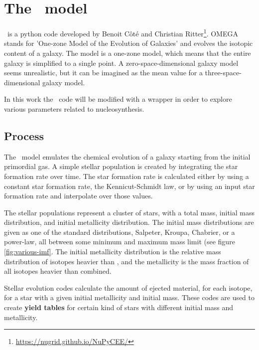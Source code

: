 \section{The \omegamodel\ model}
\label{sec:omega}
\omegamodel\ is a python code developed by Benoit C\^{o}t\'{e} and Christian Ritter\footnote{\url{https://nugrid.github.io/NuPyCEE/}}.
OMEGA stands for 'One-zone Model of the Evolution of Galaxies' and evolves the isotopic content of a galaxy.
The model is a one-zone model, which means that the entire galaxy is simplified to a single point.
A zero-space-dimensional galaxy model seems unrealistic, but it can be imagined as the mean value for a three-space-dimensional galaxy model.

In this work the \omegamodel\ code will be modified with a wrapper in order to explore various parameters related to nucleosynthesis.

\subsection{Process}
\label{sec:omega-process}
The \omegamodel\ model emulates the chemical evolution of a galaxy starting from the initial primordial gas. A simple stellar population is created by integrating the star formation rate over time.
The star formation rate is calculated either by using a constant star formation rate, the Kennicut-Schmidt law, or by using an input star formation rate and interpolate over those values.

The stellar populations represent a cluster of stars, with a total mass, initial mass distribution, and initial metallicity distribution.
The initial mass distributions are given as one of the standard distributions, Salpeter, Kroupa, Chabrier, or a power-law, all between some minimum and maximum mass limit (see figure \ref{fig:various-imf}.
The initial metallicity distribution is the relative mass distribution of isotopes heavier than , and the metallicity is the mass fraction of all isotopes heavier than  combined.

Stellar evolution codes calculate the amount of ejected material, for each isotope, for a star with a given initial metallicity and initial mass. These codes are used to create \textbf{yield tables} for certain kind of stars with different initial mass and metallicity.

